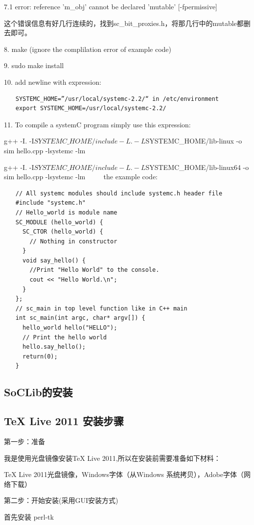 7.1 error: reference 'm\_obj' cannot be declared 'mutable' [-fpermissive]

这个错误信息有好几行连续的，找到sc\_bit\_proxies.h，将那几行中的mutable都删去即可。

8. make (ignore the complilation error of example code)

9. sudo make install

10. add newline with expression:
\begin{verbatim}
　　SYSTEMC_HOME=”/usr/local/systemc-2.2/“ in /etc/environment
　　export SYSTEMC_HOME=/usr/local/systemc-2.2/
\end{verbatim}

11. To compile a systemC program simply use this expression: 

g++ -I. -I$SYSTEMC\_HOME/include -L. -L$SYSTEMC\_HOME/lib-linux -o sim hello.cpp -lsystemc -lm %

g++ -I. -I$SYSTEMC\_HOME/include -L. -L$SYSTEMC\_HOME/lib-linux64 -o sim hello.cpp -lsystemc -lm %
　　
the example code:
\begin{verbatim}
　　// All systemc modules should include systemc.h header file
　　#include "systemc.h"
　　// Hello_world is module name
　　SC_MODULE (hello_world) {
　　  SC_CTOR (hello_world) {
　　    // Nothing in constructor 
　　  }
　　  void say_hello() {
　　    //Print "Hello World" to the console.
　　    cout << "Hello World.\n";
　　  }
　　};
　　// sc_main in top level function like in C++ main
　　int sc_main(int argc, char* argv[]) {
　　  hello_world hello("HELLO");
　　  // Print the hello world
　　  hello.say_hello();
　　  return(0);
　　}
\end{verbatim}

\subsection{SoCLib的安装}

\subsection{TeX Live 2011 安装步骤}
第一步：准备

我是使用光盘镜像安装TeX Live 2011,所以在安装前需要准备如下材料：

TeX Live 2011光盘镜像，Windows字体（从Windows 系统拷贝），Adobe字体（网络下载）

第二步：开始安装(采用GUI安装方式)

首先安装 perl-tk

